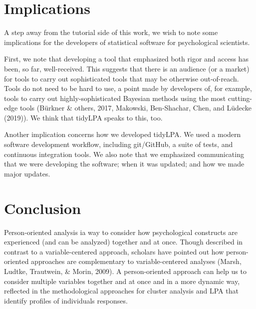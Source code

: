 \documentclass[man]{apa6}
\begin{document}
\hypertarget{implications}{%
\section{Implications}\label{implications}}

A step away from the tutorial side of this work, we wish to note some implications
for the developers of statistical software for psychological scientists.

First, we note that developing a tool that emphasized both rigor and access has
been, so far, well-received. This suggests that there is an audience (or a
market) for tools to carry out sophisticated tools that may be otherwise
out-of-reach. Tools do not need to be hard to use, a point made by developers
of, for example, tools to carry out highly-sophisticated Bayesian methods using
the most cutting-edge tools (Bürkner \& others, 2017, Makowski, Ben-Shachar, Chen, and Lüdecke (2019)). We think
that tidyLPA speaks to this, too.

Another implication concerns how we developed tidyLPA. We used a modern software
development workflow, including git/GitHub, a suite of tests, and continuous
integration tools. We also note that we emphasized communicating that we were
developing the software; when it was updated; and how we made major updates.

\hypertarget{conclusion}{%
\section{Conclusion}\label{conclusion}}

Person-oriented analysis ia way to consider how psychological constructs are
experienced (and can be analyzed) together and at once. Though described in
contrast to a variable-centered approach, scholars have pointed out how
person-oriented approaches are complementary to variable-centered analyses
(Marsh, Ludtke, Trautwein, \& Morin, 2009). A person-oriented approach can help
us to consider multiple variables together and at once and in a more dynamic
way, reflected in the methodological approaches for cluster analysis and LPA
that identify profiles of individuals responses.
\end{document}
